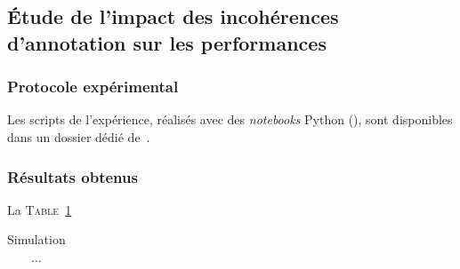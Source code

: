 			
	
	
	\subsection{Étude de l'impact des incohérences d'annotation sur les performances}
	\label{section:4.6.2-ETUDE-ROBUSTESSE-SIMULATION-IMPACT-ERREURS}
		
	
		\subsubsection{Protocole expérimental}
			
			
			\begin{leftBarInformation}
				Les scripts de l'expérience, réalisés avec des \textit{notebooks} Python (\cite{van-rossum-drake:2009:python-reference-manual}), sont disponibles dans un dossier dédié de~\cite{schild:2021:cognitivefactory-interactiveclusteringcomparativestudy}.
			\end{leftBarInformation}

		\subsubsection{Résultats obtenus}
		
			La \textsc{Table~\ref{table:4.6.2-ETUDE-ROBUSTESSE-SIMULATION-IMPACT-ERREURS}}
			
			\begin{table}[!htb]
				\begin{center}
				\begin{tabular}{|c|r|r|r|r|r|r|r|r|r|}
				\end{tabular}
				\end{center}
				\caption{
					Simulation ...
				}
				\label{table:4.6.2-ETUDE-ROBUSTESSE-SIMULATION-IMPACT-ERREURS}
			\end{table}

